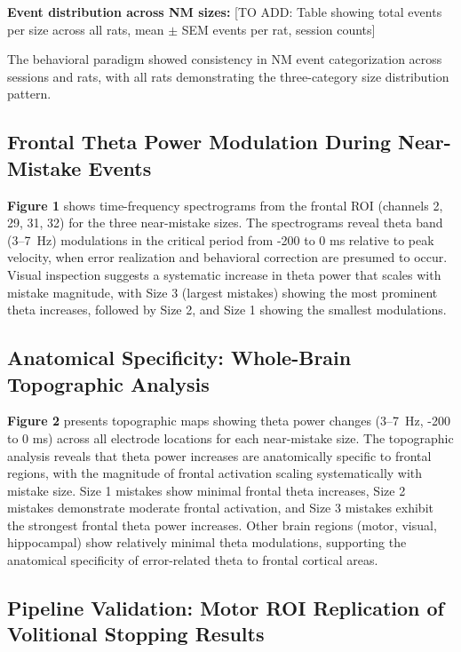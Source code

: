 \documentclass[11pt]{article}
\begin{document}
\textbf{Event distribution across NM sizes:} [TO ADD: Table showing total events per size across all rats, mean $\pm$ SEM events per rat, session counts]

The behavioral paradigm showed consistency in NM event categorization across sessions and rats, with all rats demonstrating the three-category size distribution pattern.

\subsection{Frontal Theta Power Modulation During Near-Mistake Events}

\textbf{Figure 1} shows time-frequency spectrograms from the frontal ROI (channels 2, 29, 31, 32) for the three near-mistake sizes. The spectrograms reveal theta band (3--7~Hz) modulations in the critical period from -200 to 0 ms relative to peak velocity, when error realization and behavioral correction are presumed to occur. Visual inspection suggests a systematic increase in theta power that scales with mistake magnitude, with Size 3 (largest mistakes) showing the most prominent theta increases, followed by Size 2, and Size 1 showing the smallest modulations.

\subsection{Anatomical Specificity: Whole-Brain Topographic Analysis}

\textbf{Figure 2} presents topographic maps showing theta power changes (3--7~Hz, -200 to 0 ms) across all electrode locations for each near-mistake size. The topographic analysis reveals that theta power increases are anatomically specific to frontal regions, with the magnitude of frontal activation scaling systematically with mistake size. Size 1 mistakes show minimal frontal theta increases, Size 2 mistakes demonstrate moderate frontal activation, and Size 3 mistakes exhibit the strongest frontal theta power increases. Other brain regions (motor, visual, hippocampal) show relatively minimal theta modulations, supporting the anatomical specificity of error-related theta to frontal cortical areas.

\subsection{Pipeline Validation: Motor ROI Replication of Volitional Stopping Results}
\end{document}
